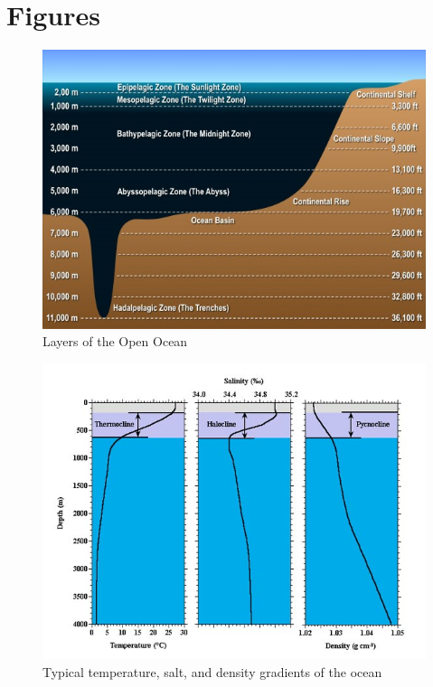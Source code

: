 \documentclass{article}
\begin{document}
\section{Figures}

\begin{figure}[H]
\centering
	\includegraphics[scale=0.8]{./Images/BC5_OceanLayers.jpg}
	\caption{Layers of the Open Ocean}
\end{figure}
\begin{figure}[H]
\centering
	\includegraphics[scale=0.5]{./Images/BC5_Clines.jpg}
	\caption{Typical temperature, salt, and density gradients of the ocean}
\end{figure}
\end{document}
